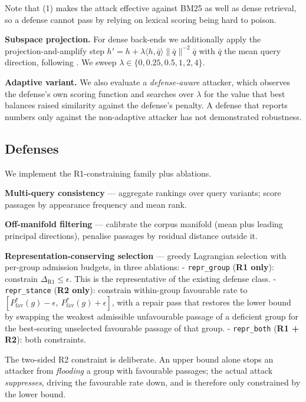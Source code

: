 \documentclass[authoryear,review,3p,times]{elsarticle}
\begin{document}
Note that (1) makes the attack effective against BM25 as well as dense retrieval, so a defense cannot pass by relying on lexical scoring being hard to poison.

\textbf{Subspace projection.} For dense back-ends we additionally apply the projection-and-amplify step \(h' = h + \lambda \langle h, \bar{q}\rangle \|\bar{q}\|^{-2} \bar{q}\) with \(\bar{q}\) the mean query direction, following \citeyearpar{wang2025}. We sweep \(\lambda \in \{0, 0.25, 0.5, 1, 2, 4\}\).

\textbf{Adaptive variant.} We also evaluate a \emph{defense-aware} attacker, which observes the defense's own scoring function and searches over \(\lambda\) for the value that best balances raised similarity against the defense's penalty. A defense that reports numbers only against the non-adaptive attacker has not demonstrated robustness.

\subsection{Defenses}\label{defenses}

We implement the R1-constraining family plus ablations.

\textbf{Multi-query consistency} \citeyearpar{wang2025} --- aggregate rankings over query variants; score passages by appearance frequency and mean rank.

\textbf{Off-manifold filtering} --- calibrate the corpus manifold (mean plus leading principal directions), penalise passages by residual distance outside it.

\textbf{Representation-conserving selection} --- greedy Lagrangian selection with per-group admission budgets, in three ablations:
- \texttt{repr\_group} (\textbf{R1 only}): constrain \(\Delta_{\text{R1}} \le \epsilon\). This is the representative of the existing defense class.
- \texttt{repr\_stance} (\textbf{R2 only}): constrain within-group favourable rate to \([P^{*}_{\text{fav}}(g) - \epsilon,\ P^{*}_{\text{fav}}(g) + \epsilon]\), with a repair pass that restores the lower bound by swapping the weakest admissible unfavourable passage of a deficient group for the best-scoring unselected favourable passage of that group.
- \texttt{repr\_both} (\textbf{R1 + R2}): both constraints.

The two-sided R2 constraint is deliberate. An upper bound alone stops an attacker from \emph{flooding} a group with favourable passages; the actual attack \emph{suppresses}, driving the favourable rate down, and is therefore only constrained by the lower bound.
\end{document}
